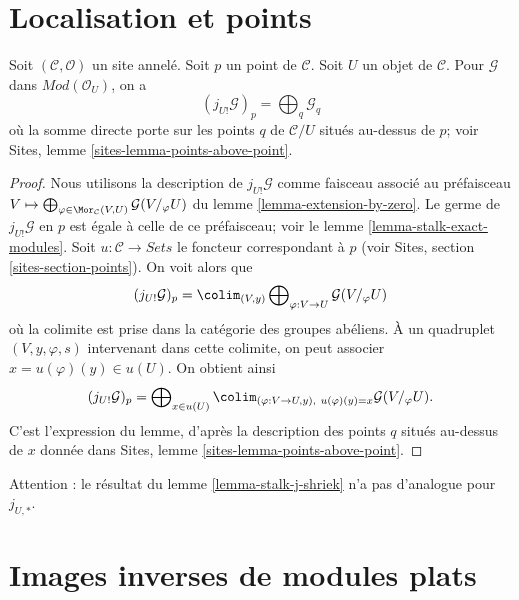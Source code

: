 \section{Localisation et points}
\label{section-localize-points}

\begin{lemma}
\label{lemma-stalk-j-shriek}
Soit $(\mathcal{C}, \mathcal{O})$ un site annelé.
Soit $p$ un point de $\mathcal{C}$. Soit $U$ un objet de $\mathcal{C}$.
Pour $\mathcal{G}$ dans $\textit{Mod}(\mathcal{O}_U)$, on a
$$
(j_{U!}\mathcal{G})_p =
\bigoplus\nolimits_q \mathcal{G}_q
$$
où la somme directe porte sur les points $q$ de $\mathcal{C}/U$ situés
au-dessus de $p$; voir Sites, lemme \ref{sites-lemma-points-above-point}.
\end{lemma}

\begin{proof}
Nous utilisons la description de $j_{U!}\mathcal{G}$ comme faisceau associé au préfaisceau
$V \mapsto
\bigoplus\nolimits_{\varphi \in \Mor_\mathcal{C}(V, U)}
\mathcal{G}(V/_\varphi U)$
du lemme \ref{lemma-extension-by-zero}. Le germe de $j_{U!}\mathcal{G}$ en
$p$ est égale à celle de ce préfaisceau; voir le
lemme \ref{lemma-stalk-exact-modules}. Soit
$u : \mathcal{C} \to \textit{Sets}$ le foncteur correspondant à $p$
(voir Sites, section \ref{sites-section-points}). On voit alors que
$$
(j_{U!}\mathcal{G})_p = \colim_{(V, y)}
\bigoplus\nolimits_{\varphi : V \to U} \mathcal{G}(V/_\varphi U)
$$
où la colimite est prise dans la catégorie des groupes abéliens.
À un quadruplet $(V, y, \varphi, s)$ intervenant dans cette colimite, on peut
associer $x = u(\varphi)(y) \in u(U)$. On obtient ainsi
$$
(j_{U!}\mathcal{G})_p =
\bigoplus\nolimits_{x \in u(U)}
\colim_{(\varphi : V \to U, y), \ u(\varphi)(y) = x} \mathcal{G}(V/_\varphi U).
$$
C'est l'expression du lemme, d'après la description des points $q$ situés
au-dessus de $x$ donnée dans Sites,
lemme \ref{sites-lemma-points-above-point}.
\end{proof}

\begin{remark}
\label{remark-not-pushforward}
Attention : le résultat du lemme \ref{lemma-stalk-j-shriek} n'a pas d'analogue
pour $j_{U, *}$.
\end{remark}












\section{Images inverses de modules plats}
\label{section-pullback-flat}

